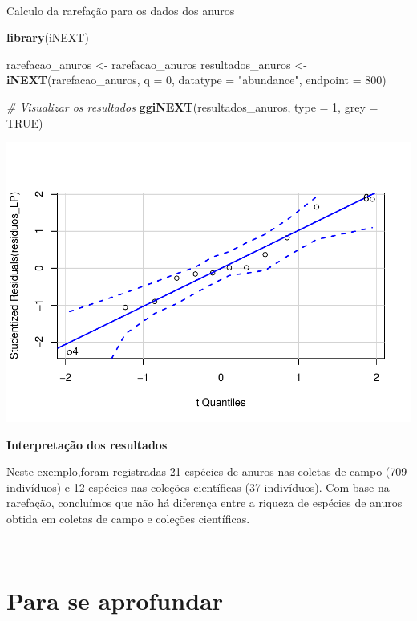 \documentclass[
]{book}
\newenvironment{Shaded}{\begin{snugshade}}{\end{snugshade}}
\newcommand{\CommentTok}[1]{\textcolor[rgb]{0.56,0.35,0.01}{\textit{#1}}}
\newcommand{\DataTypeTok}[1]{\textcolor[rgb]{0.13,0.29,0.53}{#1}}
\newcommand{\DecValTok}[1]{\textcolor[rgb]{0.00,0.00,0.81}{#1}}
\newcommand{\KeywordTok}[1]{\textcolor[rgb]{0.13,0.29,0.53}{\textbf{#1}}}
\newcommand{\NormalTok}[1]{#1}
\newcommand{\OtherTok}[1]{\textcolor[rgb]{0.56,0.35,0.01}{#1}}
\newcommand{\StringTok}[1]{\textcolor[rgb]{0.31,0.60,0.02}{#1}}
\begin{document}
~

Calculo da rarefação para os dados dos anuros

\begin{Shaded}
\begin{Highlighting}[]
\KeywordTok{library}\NormalTok{(iNEXT)}

\NormalTok{rarefacao_anuros <-}\StringTok{ }\NormalTok{rarefacao_anuros}
\NormalTok{resultados_anuros <-}\StringTok{ }\KeywordTok{iNEXT}\NormalTok{(rarefacao_anuros, }\DataTypeTok{q =} \DecValTok{0}\NormalTok{, }\DataTypeTok{datatype =} \StringTok{"abundance"}\NormalTok{, }\DataTypeTok{endpoint =} \DecValTok{800}\NormalTok{)}

\CommentTok{# Visualizar os resultados }
\KeywordTok{ggiNEXT}\NormalTok{(resultados_anuros, }\DataTypeTok{type =} \DecValTok{1}\NormalTok{, }\DataTypeTok{grey =} \OtherTok{TRUE}\NormalTok{)}
\end{Highlighting}
\end{Shaded}

\includegraphics{livro_r_ecologia_files/figure-latex/unnamed-chunk-3-1.pdf}

\textbf{Interpretação dos resultados}

Neste exemplo,foram registradas 21 espécies de anuros nas coletas de campo (709 indivíduos) e 12 espécies nas coleções científicas (37 indivíduos). Com base na rarefação, concluímos que não há diferença entre a riqueza de espécies de anuros obtida em coletas de campo e coleções científicas.

~

\hypertarget{para-se-aprofundar}{%
\section{Para se aprofundar}\label{para-se-aprofundar}}
\end{document}

